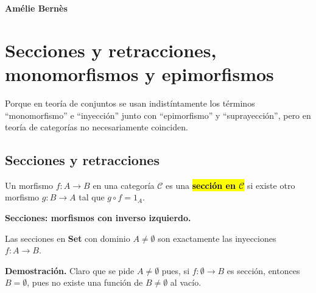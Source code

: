 \documentclass[10pt]{article}
\newcommand{\hlgray}[1]{{\sethlcolor{Ivory2}\hl{#1}}}
\newtheorem[M]{teo}{Teorema}[section]
\newtheorem[M]{listaObj}[teo]{Lista de deseos}
\newtheorem[M]{preg}[teo]{Pregunta}
\newtheorem[M]{lema}[teo]{Lema}
\newtheorem[M]{hip}[teo]{Hipótesis}
\newtheorem[M]{prop}[teo]{Proposición}
\newtheorem[M]{obs}[teo]{Observación}
\newtheorem[M]{cor}[teo]{Corolario}
\newtheorem[M]{notacion}[teo]{Notación}
\newtheorem[M]{nota}[teo]{Nota}
\begin{document}
\begin{flushright}
\textbf{Amélie Bernès}
\end{flushright}
\tableofcontents

\section{Secciones y retracciones, monomorfismos y epimorfismos}

Porque en teoría de conjuntos se usan indistíntamente los términos
``monomorfismo'' e ``inyección'' junto con 
``epimorfismo'' y ``suprayección'', pero en teoría de categorías
no necesariamente coinciden.

\subsection{Secciones y retracciones}
\begin{defi}
Un morfismo $f: A \longrightarrow B$ en una categoría 
$\mathcal{C}$ es una 
\hlgray{\textbf{sección en $\mathcal{C}$}} si existe
otro morfismo $g: B \longrightarrow A$ tal que $g \circ f = 1_{A}$.
\end{defi}
\begin{center}
\textbf{Secciones: morfismos con inverso izquierdo.}
\end{center}
\begin{prop}
Las secciones en \textbf{Set} 
con dominio $A \neq \emptyset$
son exactamente las inyecciones
$f: A \longrightarrow B$.
\end{prop}
\noindent
\textbf{Demostración.}
Claro que se pide $A \neq \emptyset$ pues, 
si $f: \emptyset \longrightarrow B$ es sección, 
entonces $B = \emptyset$, pues no existe una función de 
$B \neq \emptyset$ al vacío.
\end{document}
